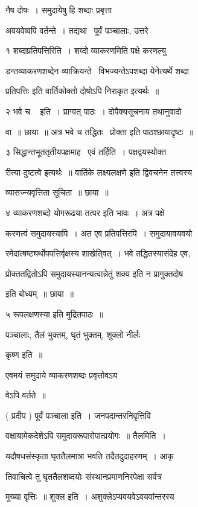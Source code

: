 \documentclass[11pt, openany]{book}
\begin{document}
नैष दोषः~। समुदायेषु हि शब्दाः प्रबृत्ता 

अवयवेष्वपि वर्तन्ते~। तद्यथा \textendash\ पूर्वं पञ्चालाः, उत्तरे 



१ शब्दाप्रतिपत्तिरिति~। शव्दो व्याकरणमिति पक्षे करणल्यु \textendash\ 

डन्तव्याकरणशब्देन व्याक्रियन्ते \textendash\ विभज्यन्तेऽपशब्दा येनेत्यर्थे शब्दा \textendash\ 

{\qt प्रतिपत्तिः} इति वार्तिकोक्तो दोषोऽपि निराकृत इत्यर्थः~॥ 

२ {\qt भवे च \textendash\ } इति~। प्राग्वत् पाठः~। दोपैक्यसूचनाय तथानुवादो 

वा~॥ छाया~॥ अत्र {\qt भवे च तद्धितः \textendash\ प्रोक्ता} इति पाठश्छायादृष्टः~॥ 

३ सिद्धान्तभूततृतीयपक्षमाह \textendash\ एवं तर्हिति~। पक्षद्वयस्योक्त \textendash\ 

रीत्या दुष्टत्वे इत्यर्थः~॥ वार्तिके लक्ष्यलक्षणे इति द्विवचनेन
तत्त्वस्य 

व्यासज्न्यवृत्तिता सूचिता~॥ छाया~॥ 

४ व्याकरणशब्दो योगरूढया तत्पर इति भावः~। अत्र पक्षे 

करणत्वं समुदायस्यापि~। अत एव प्रतिपत्तिरपि~। समुदायावयवयो \textendash\ 

रमेदांत्षष्ट्यर्थोपपत्तिर्वृक्षस्य शाखेति्वत्~। भवे तद्धितस्यासंदेह एव,


प्रोक्ततद्वितोऽपि समुदायस्यानन्यत्वान्नेतुं शक्य इति न प्रागुक्तदोष 

इति बोध्यम्~॥ छाया~॥ 

५ {\qt रूपलक्षणस्या} इति मुद्रितपाठः~॥ 





पञ्चालाः, तैलं भुक्तम्, घृतं भुक्तम्, शुक्लो नीर्लः 

कृष्ण इति~॥ 

एवमयं समुदाये व्याकरणशब्दः प्रवृत्तोवऽय \textendash\ 

वेऽपि वर्तते~॥ 

( प्रदीप ) पूर्वं पञ्चाला इति~। जनपदान्तरनिवृत्तिवि \textendash\ 

वक्षायामेकदेशेऽपि समुदायरूपारोपात्प्रयोगः~॥ तैलमिति~। 

यदौषधसंस्कृता घृततैलमात्रा भवति तदैतदुदाहरणम्~। आकृ \textendash\ 

तिवाचित्वे तु घृततैलशब्दयोः संस्थानप्रमाणनिरपेक्षा सर्वत्र 

मुख्या वृत्तिः~॥ शुक्ल इति~। अशुक्लेऽप्यवयवेऽवयवांन्तरस्य 
\end{document}
